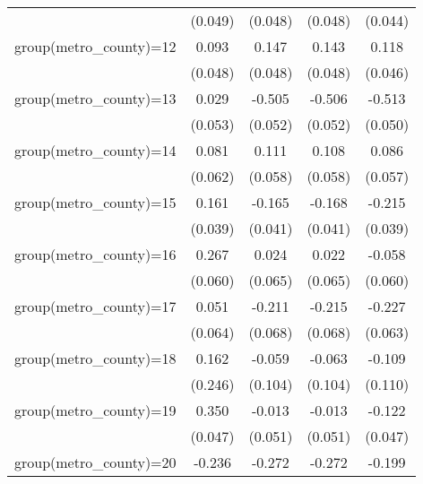 {\begin{tabular}{l*{4}{c}}
                    &     (0.049)         &     (0.048)         &     (0.048)         &     (0.044)         \\
group(metro\_county)=12&       0.093\sym{*}  &       0.147\sym{***}&       0.143\sym{***}&       0.118\sym{**} \\
                    &     (0.048)         &     (0.048)         &     (0.048)         &     (0.046)         \\
group(metro\_county)=13&       0.029         &      -0.505\sym{***}&      -0.506\sym{***}&      -0.513\sym{***}\\
                    &     (0.053)         &     (0.052)         &     (0.052)         &     (0.050)         \\
group(metro\_county)=14&       0.081         &       0.111\sym{*}  &       0.108\sym{*}  &       0.086         \\
                    &     (0.062)         &     (0.058)         &     (0.058)         &     (0.057)         \\
group(metro\_county)=15&       0.161\sym{***}&      -0.165\sym{***}&      -0.168\sym{***}&      -0.215\sym{***}\\
                    &     (0.039)         &     (0.041)         &     (0.041)         &     (0.039)         \\
group(metro\_county)=16&       0.267\sym{***}&       0.024         &       0.022         &      -0.058         \\
                    &     (0.060)         &     (0.065)         &     (0.065)         &     (0.060)         \\
group(metro\_county)=17&       0.051         &      -0.211\sym{***}&      -0.215\sym{***}&      -0.227\sym{***}\\
                    &     (0.064)         &     (0.068)         &     (0.068)         &     (0.063)         \\
group(metro\_county)=18&       0.162         &      -0.059         &      -0.063         &      -0.109         \\
                    &     (0.246)         &     (0.104)         &     (0.104)         &     (0.110)         \\
group(metro\_county)=19&       0.350\sym{***}&      -0.013         &      -0.013         &      -0.122\sym{**} \\
                    &     (0.047)         &     (0.051)         &     (0.051)         &     (0.047)         \\
group(metro\_county)=20&      -0.236\sym{***}&      -0.272\sym{***}&      -0.272\sym{***}&      -0.199\sym{***}\\

\end{tabular}}
